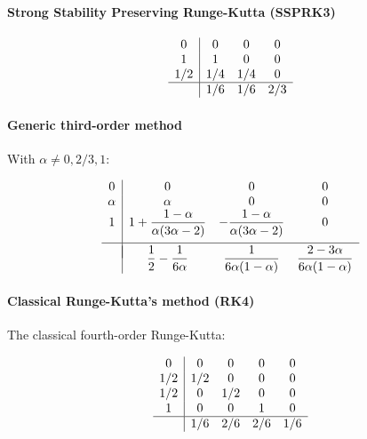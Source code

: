 \paragraph{Strong Stability Preserving Runge-Kutta (SSPRK3)}

\begin{equation}
	\begin{array}{c|ccc}
		0   & 0   & 0   & 0 \\
		1   & 1   & 0   & 0 \\
		1/2 & 1/4 & 1/4 & 0 \\ \hline
		    & 1/6 & 1/6 & 2/3
	\end{array}
	\label{eq::SSPRK3}
\end{equation}

\paragraph{Generic third-order method}
With $\alpha \neq 0, 2/3, 1$:

\begin{equation}
	\begin{array}{c|ccc}
		0      & 0      & 0 & 0 \\
		\alpha & \alpha & 0 & 0 \\
		1      & 1+\dfrac{1-\alpha}{\alpha(3\alpha-2)} & -\dfrac{1-\alpha}{\alpha(3\alpha-2)} & 0 
		\\[1em]
		\hline
		\\[-1em]
		       & \dfrac{1}{2}-\dfrac{1}{6\alpha} & \dfrac{1}{6\alpha(1-\alpha)} & \dfrac{2-3\alpha}{6\alpha(1-\alpha)}
	\end{array}
	\label{eq::generic_third}
\end{equation}

\paragraph{Classical Runge-Kutta's method (RK4)}
The classical fourth-order Runge-Kutta:

\begin{equation}
	\begin{array}
	{c|cccc}
		0   & 0   & 0   & 0   & 0 \\
		1/2 & 1/2 & 0   & 0   & 0 \\
		1/2 & 0   & 1/2 & 0   & 0 \\
		1   & 0   & 0   & 1   & 0 \\ \hline
		    & 1/6 & 2/6 & 2/6 & 1/6
	\end{array}
	\label{eq::RK4}
\end{equation}

